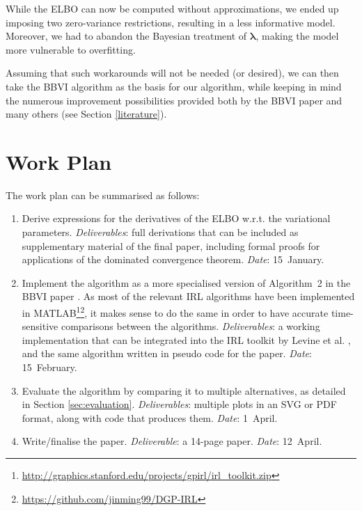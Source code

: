 \documentclass{mprop}
\theoremstyle{definition}
\begin{document}
While the ELBO can now be computed without approximations, we ended up imposing
two zero-variance restrictions, resulting in a less informative model. Moreover,
we had to abandon the Bayesian treatment of $\bm\lambda$, making the model more
vulnerable to overfitting.

Assuming that such workarounds will not be needed (or desired), we can then take
the BBVI algorithm as the basis for our algorithm, while keeping in mind the
numerous improvement possibilities provided both by the BBVI paper
\cite{DBLP:conf/aistats/RanganathGB14} and many others (see Section
\ref{literature}).

\section{Work Plan}

The work plan can be summarised as follows:
\begin{enumerate}
\item Derive expressions for the derivatives of the ELBO w.r.t. the variational
  parameters. \emph{Deliverables}: full derivations that can be included as
  supplementary material of the final paper, including formal proofs for
  applications of the dominated convergence theorem. \emph{Date}: 15~January.
\item Implement the algorithm as a more specialised version of Algorithm~2 in
  the BBVI paper \cite{DBLP:conf/aistats/RanganathGB14}. As most of the relevant
  IRL algorithms have been implemented in
  MATLAB\footnote{\url{http://graphics.stanford.edu/projects/gpirl/irl_toolkit.zip}}\footnote{\url{https://github.com/jinming99/DGP-IRL}},
  it makes sense to do the same in order to have accurate time-sensitive
  comparisons between the algorithms. \emph{Deliverables}: a working
  implementation that can be integrated into the IRL toolkit by Levine et al.
  \cite{DBLP:conf/nips/LevinePK11}, and the same algorithm written in pseudo
  code for the paper. \emph{Date}: 15~February.
\item Evaluate the algorithm by comparing it to multiple alternatives, as
  detailed in Section \ref{sec:evaluation}. \emph{Deliverables}: multiple plots
  in an SVG or PDF format, along with code that produces them. \emph{Date}:
  1~April.
\item Write/finalise the paper. \emph{Deliverable}: a 14-page paper.
  \emph{Date}: 12~April.
\end{enumerate}
\end{document}
